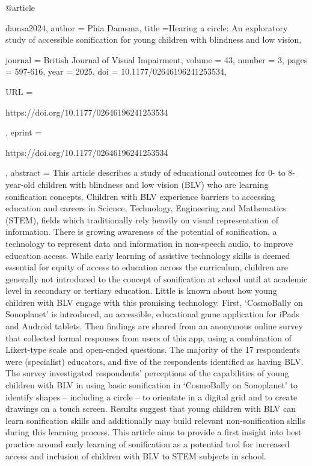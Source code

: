 @article{damsa2024,
author = {Phia Damsma},
title ={Hearing a circle: An exploratory study of accessible sonification for young children with blindness and low vision},

journal = {British Journal of Visual Impairment},
volume = {43},
number = {3},
pages = {597-616},
year = {2025},
doi = {10.1177/02646196241253534},

URL = { 
    
        https://doi.org/10.1177/02646196241253534
    
    

},
eprint = { 
    
        https://doi.org/10.1177/02646196241253534
    
    

}
,
    abstract = { This article describes a study of educational outcomes for 0- to 8-year-old children with blindness and low vision (BLV) who are learning sonification concepts. Children with BLV experience barriers to accessing education and careers in Science, Technology, Engineering and Mathematics (STEM), fields which traditionally rely heavily on visual representation of information. There is growing awareness of the potential of sonification, a technology to represent data and information in non-speech audio, to improve education access. While early learning of assistive technology skills is deemed essential for equity of access to education across the curriculum, children are generally not introduced to the concept of sonification at school until at academic level in secondary or tertiary education. Little is known about how young children with BLV engage with this promising technology. First, ‘CosmoBally on Sonoplanet’ is introduced, an accessible, educational game application for iPads and Android tablets. Then findings are shared from an anonymous online survey that collected formal responses from users of this app, using a combination of Likert-type scale and open-ended questions. The majority of the 17 respondents were (specialist) educators, and five of the respondents identified as having BLV. The survey investigated respondents’ perceptions of the capabilities of young children with BLV in using basic sonification in ‘CosmoBally on Sonoplanet’ to identify shapes – including a circle – to orientate in a digital grid and to create drawings on a touch screen. Results suggest that young children with BLV can learn sonification skills and additionally may build relevant non-sonification skills during this learning process. This article aims to provide a first insight into best practice around early learning of sonification as a potential tool for increased access and inclusion of children with BLV to STEM subjects in school. }
}


